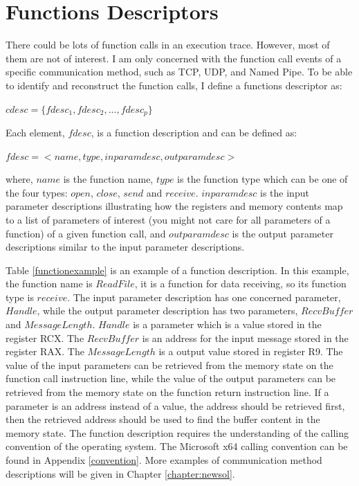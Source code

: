 \section{Functions Descriptors}\label{cdesc}
There could be lots of function calls in an execution trace. However, most of them are not of interest. I am only concerned with the function call events of a specific communication method, such as TCP, UDP, and Named Pipe. To be able to identify and reconstruct the function calls, I define a functions descriptor as:

$cdesc = \lbrace fdesc_1, fdesc_2,...,fdesc_p \rbrace$

Each element, $fdesc$, is a function description and can be defined as:

$fdesc = < name, type, inparamdesc, outparamdesc >$

where, $name$ is the function name, $type$ is the function type which can be one of the four types: $open$, $close$, $send$ and $receive$. $inparamdesc$ is the input parameter descriptions illustrating how the registers and memory contents map to a list of parameters of interest (you might not care for all parameters of a function) of a given function call, and $outparamdesc$ is the output parameter descriptions similar to the input parameter descriptions. 

Table \ref{functionexample} is an example of a function description. In this example, the function name is $ReadFile$, it is a function for data receiving, so its function type is $receive$. The input parameter description has one concerned parameter, $Handle$, while the output parameter description has two parameters, ${RecvBuffer}$ and $MessageLength$. $Handle$ is a parameter which is a value stored in the register RCX. The $RecvBuffer$ is an address for the input message stored in the register RAX. The $MessageLength$ is a output value stored in register R9. The value of the input parameters can be retrieved from the memory state on the function call instruction line, while the value of the output parameters can be retrieved from the memory state on the function return instruction line. If a parameter is an address instead of a value, the address should be retrieved first, then the retrieved address should be used to find the buffer content in the memory state. The function description requires the understanding of the calling convention of the operating system. The Microsoft x64 calling convention can be found in Appendix \ref{convention}. More examples of communication method descriptions will be given in Chapter \ref{chapter:newsol}.

